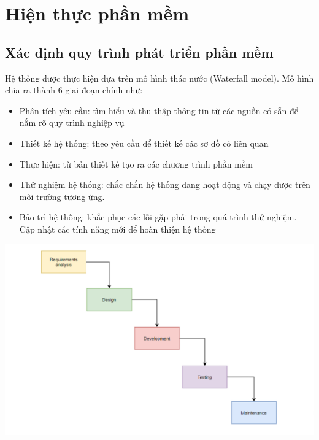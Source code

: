 \documentclass[12pt,a4paper,2sides]{report}
\begin{document}
\chapter{Hiện thực phần mềm}
\section{Xác định quy trình phát triển phần mềm}
Hệ thống được thực hiện dựa trên mô hình thác nước (Waterfall model). Mô hình chia ra thành 6 giai đoạn chính như:
\begin{itemize}
    \item Phân tích yêu cầu: tìm hiểu và thu thập thông tin từ các nguồn có sẵn để nắm rõ quy trình nghiệp vụ
    \item Thiết kế hệ thống: theo yêu cầu để thiết kế các sơ đồ có liên quan
    \item Thực hiện: từ bản thiết kế tạo ra các chương trình phần mềm
    \item Thử nghiệm hệ thống: chắc chắn hệ thống đang hoạt động và chạy được trên môi trường tương ứng. 
    \item Bảo trì hệ thống: khắc phục các lỗi gặp phải trong quá trình thử nghiệm. Cập nhật các tính năng mới để hoàn thiện hệ thống
\end{itemize}
 \includegraphics[width=1\linewidth]{lib/Waterfall.png}\\\vspace*{1cm} 
\hspace{5cm}{Hình 36. Waterfall}\\
\end{document}
